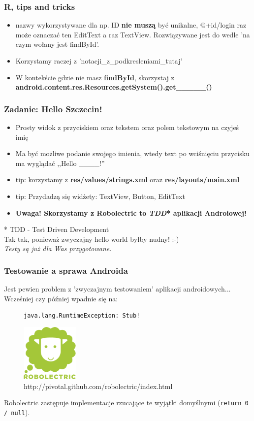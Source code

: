 \begin{frame}\frametitle{R, tips and tricks}
\begin{itemize}
 \item nazwy wykorzystywane dla np. ID \textbf{nie muszą} być unikalne, @+id/login raz może oznaczać ten EditText a raz TextView.
       Rozwiązywane jest do wedle 'na czym wołany jest findById'.
 \pause \item Korzystamy raczej z 'notacji\_z\_podkresleniami\_tutaj'
 \pause \item W kontekście gdzie nie masz \textbf{findById}, skorzystaj z \textbf{android.content.res.Resources.getSystem().get\_\_\_\_\_()}
\end{itemize}
\end{frame}

\begin{frame}\frametitle{Zadanie: Hello Szczecin!}
\begin{itemize}
 \item Prosty widok z przyciskiem oraz tekstem oraz polem tekstowym na czyjeś imię
 \item Ma być możliwe podanie swojego imienia, wtedy text po wciśnięciu przycisku ma wyglądać ,,Hello \_\_\_\_!''
 \item tip: korzystamy z \textbf{res/values/strings.xml} oraz \textbf{res/layouts/main.xml}
 \item tip: Przydadzą się widżety: TextView, Button, EditText
 \pause \item \textbf{Uwaga! Skorzystamy z \textbf{Robolectric} to \textit{TDD}* aplikacji Androiowej!}
\end{itemize}

* TDD - Test Driven Development\\
Tak tak, ponieważ zwyczajny hello world byłby nudny! :-)\\
\textit{Testy są już dla Was przygotowane.}
\end{frame}

\begin{frame}[fragile]\frametitle{Testowanie a sprawa Androida}
Jest pewien problem z 'zwyczajnym testowaniem' aplikacji androidowych... Wcześniej czy później wpadnie się na:
 
 \begin{figure}[ch]
  \verb|java.lang.RuntimeException: Stub!|
 \end{figure}

\begin{figure}[hc]
\includegraphics[width=0.25\textwidth]{images/robolectric}\\
\centering
http://pivotal.github.com/robolectric/index.html
\end{figure}

Robolectric zastępuje implementacje rzucające te wyjątki domyślnymi (\verb|return 0 / null|).
\end{frame}

